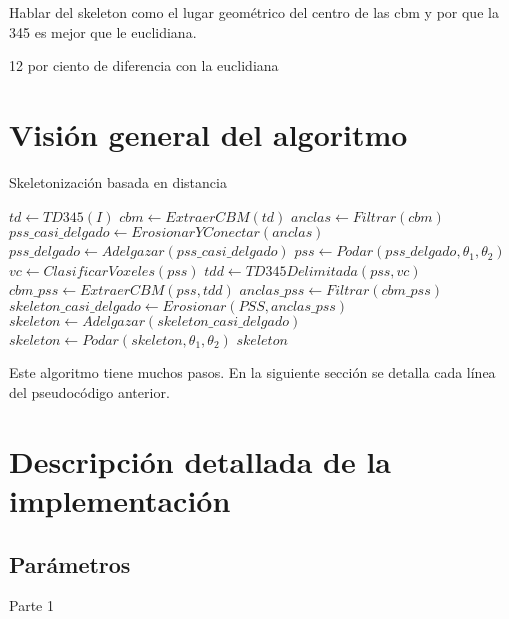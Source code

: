 Hablar del skeleton como el lugar geométrico del centro de las cbm y por que la 345 es mejor que le euclidiana.

12 por ciento de diferencia con la euclidiana \cite{borgefors1996digital}

\section{Visión general del algoritmo}

\begin{algorithm}
\caption{Skeletonización basada en distancia}
\label{alg:ddskel}
\begin{algorithmic}[1]
	\State $td \gets TD345(I)$
    \State $cbm \gets ExtraerCBM(td)$
    \State $anclas \gets Filtrar(cbm)$
    \State $pss\_casi\_delgado \gets ErosionarYConectar(anclas)$
    \State $pss\_delgado \gets Adelgazar(pss\_casi\_delgado)$
    \State $pss \gets Podar(pss\_delgado, \theta_1, \theta_2)$ \label{ddprune1}
    \State $vc \gets ClasificarVoxeles(pss)$
    \State $tdd \gets TD345Delimitada(pss, vc)$
    \State $cbm\_pss \gets ExtraerCBM(pss, tdd)$
    \State $anclas\_pss \gets Filtrar(cbm\_pss)$
    \State $skeleton\_casi\_delgado \gets Erosionar(PSS, anclas\_pss)$
    \State $skeleton \gets Adelgazar(skeleton\_casi\_delgado)$
    \State $skeleton \gets Podar(skeleton, \theta_1, \theta_2)$ \label{ddprune2}
    \State \Return $skeleton$
\EndFunction
\end{algorithmic}
\end{algorithm}

Este algoritmo tiene muchos pasos. En la siguiente sección se detalla cada línea del pseudocódigo anterior.

\section{Descripción detallada de la implementación}

\subsection{Parámetros}

\begin{algorithm}[H]
\addtocounter{algorithm}{-1}
\caption{Parte 1}
\begin{algorithmic}[1]
\end{algorithmic}
\end{algorithm}

